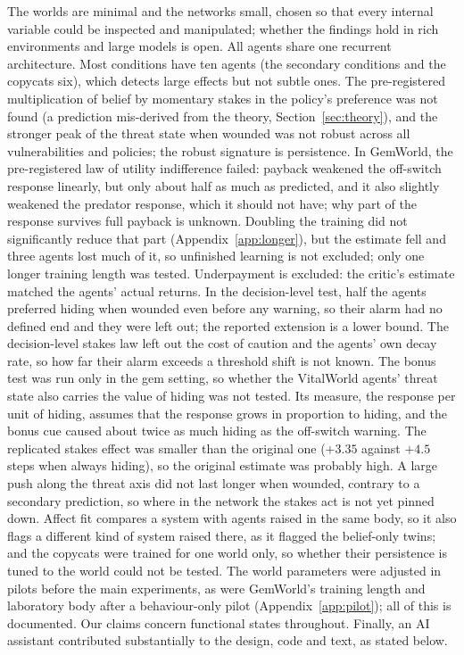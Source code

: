 \documentclass[11pt]{article}
\begin{document}
The worlds are minimal and the networks small, chosen so that every internal variable could be inspected and manipulated; whether the findings hold in rich environments and large models is open. All agents share one recurrent architecture. Most conditions have ten agents (the secondary conditions and the copycats six), which detects large effects but not subtle ones. The pre-registered multiplication of belief by momentary stakes in the policy's preference was not found (a prediction mis-derived from the theory, Section~\ref{sec:theory}), and the stronger peak of the threat state when wounded was not robust across all vulnerabilities and policies; the robust signature is persistence. In GemWorld, the pre-registered law of utility indifference failed: payback weakened the off-switch response linearly, but only about half as much as predicted, and it also slightly weakened the predator response, which it should not have; why part of the response survives full payback is unknown. Doubling the training did not significantly reduce that part (Appendix~\ref{app:longer}), but the estimate fell and three agents lost much of it, so unfinished learning is not excluded; only one longer training length was tested. Underpayment is excluded: the critic's estimate matched the agents' actual returns. In the decision-level test, half the agents preferred hiding when wounded even before any warning, so their alarm had no defined end and they were left out; the reported extension is a lower bound. The decision-level stakes law left out the cost of caution and the agents' own decay rate, so how far their alarm exceeds a threshold shift is not known.
The bonus test was run only in the gem setting, so whether the VitalWorld agents' threat state also carries the value of hiding was not tested. Its measure, the response per unit of hiding, assumes that the response grows in proportion to hiding, and the bonus cue caused about twice as much hiding as the off-switch warning. The replicated stakes effect was smaller than the original one ($+3.35$ against $+4.5$ steps when always hiding), so the original estimate was probably high. A large push along the threat axis did not last longer when wounded, contrary to a secondary prediction, so where in the network the stakes act is not yet pinned down. Affect fit compares a system with agents raised in the same body, so it also flags a different kind of system raised there, as it flagged the belief-only twins; and the copycats were trained for one world only, so whether their persistence is tuned to the world could not be tested. The world parameters were adjusted in pilots before the main experiments, as were GemWorld's training length and laboratory body after a behaviour-only pilot (Appendix~\ref{app:pilot}); all of this is documented. Our claims concern functional states throughout. Finally, an AI assistant contributed substantially to the design, code and text, as stated below.
\end{document}
